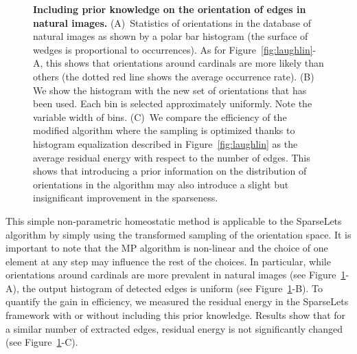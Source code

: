 \documentclass[a4paper, 11pt]{book}
\begin{document}
\begin{figure}
{}
\caption{ {\bf Including prior knowledge on the orientation of edges in natural images.}  \textsf{(A)}~Statistics of orientations in the database of natural images as shown by a polar bar histogram (the surface of wedges is proportional to occurrences). As for Figure~\ref{fig:laughlin}-A, this shows that orientations around cardinals are more likely than others (the dotted red line shows the average occurrence rate). \textsf{(B)}~ We show the histogram with the new set of orientations that has been used. Each bin is selected approximately uniformly. Note the variable width of bins. 
\textsf{(C)}~We compare the efficiency of the modified algorithm where the sampling is optimized thanks to histogram equalization described in Figure~\ref{fig:laughlin} as the average residual energy with respect to the number of edges. %
This shows that  introducing a prior information on the distribution of orientations in the algorithm may also introduce a slight but insignificant improvement in the sparseness. %
\label{fig:firstorder}}%
\end{figure}%
This simple non-parametric homeostatic method is applicable to the SparseLets algorithm by simply using the transformed sampling of the orientation space.
It is important to note that the MP algorithm is non-linear and the choice of one element at any step may influence the rest of the choices.
In particular, while orientations around cardinals are more prevalent in natural images (see Figure~\ref{fig:firstorder}-A), the output histogram of detected edges is uniform (see Figure~\ref{fig:firstorder}-B). %
To quantify the gain in efficiency, we measured the residual energy in the SparseLets framework with or without including this prior knowledge. Results show that for a similar number of extracted edges, residual energy is not significantly changed (see Figure~\ref{fig:firstorder}-C).
\end{document}
